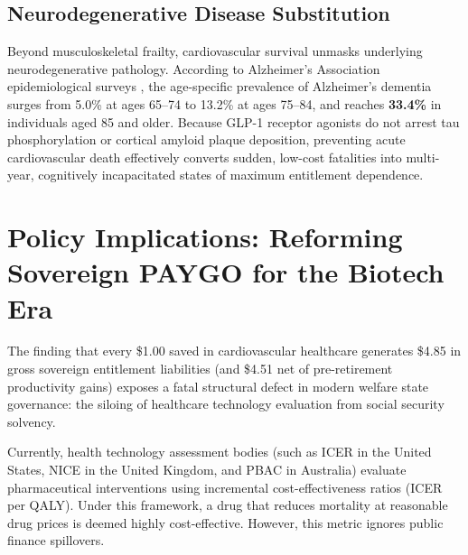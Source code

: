 \documentclass[11pt,a4paper]{article}
\begin{document}
\subsection{Neurodegenerative Disease Substitution}
Beyond musculoskeletal frailty, cardiovascular survival unmasks underlying neurodegenerative pathology. According to Alzheimer's Association epidemiological surveys \citep{alzheimer2024facts}, the age-specific prevalence of Alzheimer's dementia surges from 5.0\% at ages 65--74 to 13.2\% at ages 75--84, and reaches \textbf{33.4\%} in individuals aged 85 and older. Because GLP-1 receptor agonists do not arrest tau phosphorylation or cortical amyloid plaque deposition, preventing acute cardiovascular death effectively converts sudden, low-cost fatalities into multi-year, cognitively incapacitated states of maximum entitlement dependence.

\section{Policy Implications: Reforming Sovereign PAYGO for the Biotech Era}
\label{sec:policy}
The finding that every \$1.00 saved in cardiovascular healthcare generates \$4.85 in gross sovereign entitlement liabilities (and \$4.51 net of pre-retirement productivity gains) exposes a fatal structural defect in modern welfare state governance: the siloing of healthcare technology evaluation from social security solvency.

Currently, health technology assessment bodies (such as ICER in the United States, NICE in the United Kingdom, and PBAC in Australia) evaluate pharmaceutical interventions using incremental cost-effectiveness ratios (ICER per QALY). Under this framework, a drug that reduces mortality at reasonable drug prices is deemed highly cost-effective. However, this metric ignores public finance spillovers.
\end{document}
